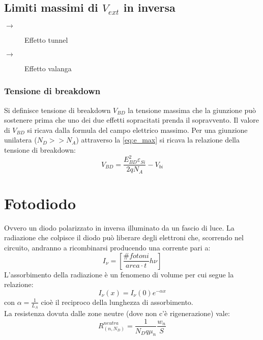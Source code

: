 \documentclass{article}
\begin{document}
\subsection*{Limiti massimi di $V_{ext}$ in inversa}
\begin{description}
\item [$\rightarrow$] Effetto tunnel
\item [$\rightarrow$] Effetto valanga
\end{description}

\subsubsection*{Tensione di breakdown}
Si definisce tensione di breakdown $V_{BD}$ la tensione massima che la giunzione può sostenere prima che uno dei due effetti sopracitati prenda il sopravvento. Il valore di $V_{BD}$ si ricava dalla formula del campo elettrico massimo. Per una giunzione unilatera ($N_D>>N_A$) attraverso la \eqref{eq:e_max} si ricava la relazione della tensione di breakdown:
\begin{equation*}
V_{BD} = \frac{E_{BD}^2 \varepsilon_{Si}}{2qN_A} - V_{bi}
\end{equation*}

\section*{Fotodiodo}
Ovvero un diodo polarizzato in inversa illuminato da un fascio di luce.
La radiazione che colpisce il diodo può liberare degli elettroni che, scorrendo nel circuito, andranno a ricombinarsi producendo una corrente pari a:
\begin{equation*}
I_\nu = \left[\frac{\#fotoni}{area \cdot t} h\nu\right]
\end{equation*}
L'assorbimento della radiazione è un fenomeno di volume per cui segue la relazione:
\begin{equation*}
I_\nu(x) = I_\nu(0) e^{-\alpha x}
\end{equation*}
con $\alpha = \frac{1}{L_A}$ cioè il reciproco della lunghezza di assorbimento.
\\
La resistenza dovuta dalle zone neutre (dove non c'è rigenerazione) vale:
\begin{equation*}
R_{(n, N_D)}^{neutra} = \frac{1}{N_D q \mu_n} \frac{w_n}{S}
\end{equation*}
\end{document}
